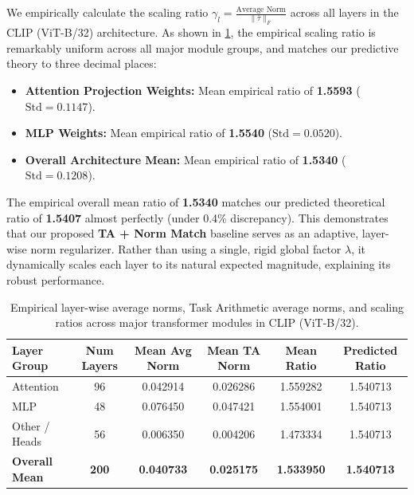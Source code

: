\documentclass{article}
\begin{document}
We empirically calculate the scaling ratio $\gamma_l = \frac{\text{Average Norm}}{\|\bar{\tau}\|_F}$ across all layers in the CLIP (ViT-B/32) architecture. As shown in \cref{tab:layer_norms}, the empirical scaling ratio is remarkably uniform across all major module groups, and matches our predictive theory to three decimal places:
\begin{itemize}
    \item \textbf{Attention Projection Weights:} Mean empirical ratio of \textbf{1.5593} ($\text{Std} = 0.1147$).
    \item \textbf{MLP Weights:} Mean empirical ratio of \textbf{1.5540} ($\text{Std} = 0.0520$).
    \item \textbf{Overall Architecture Mean:} Mean empirical ratio of \textbf{1.5340} ($\text{Std} = 0.1208$).
\end{itemize}

The empirical overall mean ratio of \textbf{1.5340} matches our predicted theoretical ratio of \textbf{1.5407} almost perfectly (under 0.4\% discrepancy). This demonstrates that our proposed \textbf{TA + Norm Match} baseline serves as an adaptive, layer-wise norm regularizer. Rather than using a single, rigid global factor $\lambda$, it dynamically scales each layer to its natural expected magnitude, explaining its robust performance.

\begin{table}[h]
\caption{Empirical layer-wise average norms, Task Arithmetic average norms, and scaling ratios across major transformer modules in CLIP (ViT-B/32).}
\label{tab:layer_norms}
\vskip 0.15in
\begin{center}
\begin{small}
\begin{sc}
\begin{tabular}{lccccc}
\toprule
Layer Group & Num Layers & Mean Avg Norm & Mean TA Norm & Mean Ratio & Predicted Ratio \\
\midrule
Attention & 96 & 0.042914 & 0.026286 & 1.559282 & 1.540713 \\
MLP & 48 & 0.076450 & 0.047421 & 1.554001 & 1.540713 \\
Other / Heads & 56 & 0.006350 & 0.004206 & 1.473334 & 1.540713 \\
\midrule
\textbf{Overall Mean} & \textbf{200} & \textbf{0.040733} & \textbf{0.025175} & \textbf{1.533950} & \textbf{1.540713} \\
\bottomrule
\end{tabular}
\end{sc}
\end{small}
\end{center}
\vskip -0.1in
\end{table}
\end{document}
